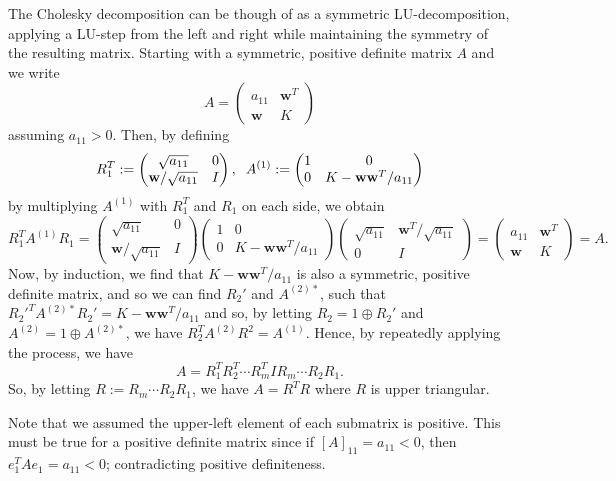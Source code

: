 \documentclass[
]{article}
\theoremstyle{definition}
\theoremstyle{definition}
\begin{document}
The Cholesky decomposition can be though of as a symmetric
LU-decomposition, applying a LU-step from the left and right while
maintaining the symmetry of the resulting matrix. Starting with a
symmetric, positive definite matrix \(A\) and we write
\[A = \begin{pmatrix}
  a_{11} & \mathbf{w}^T\\
  \mathbf{w} & K
  \end{pmatrix}\] assuming \(a_{11} > 0\). Then, by defining
\[R_1^T := \begin{pmatrix}
  \sqrt{a_{11}} & 0\\
  \mathbf{w} / \sqrt{a_{11}} & I
  \end{pmatrix}, \hspace{2mm} A^{(1)} := 
  \begin{pmatrix}
    1 & 0\\
    0 & K - \mathbf{w}\mathbf{w}^T / a_{11}
  \end{pmatrix}\] by multiplying \(A^{(1)}\) with \(R_1^T\) and \(R_1\)
on each side, we obtain \[R_1^T A^{(1)} R_1 = 
  \begin{pmatrix}
  \sqrt{a_{11}} & 0\\
  \mathbf{w} / \sqrt{a_{11}} & I
  \end{pmatrix}
  \begin{pmatrix}
    1 & 0\\
    0 & K - \mathbf{w}\mathbf{w}^T / a_{11}
  \end{pmatrix}
  \begin{pmatrix}
  \sqrt{a_{11}} & \mathbf{w}^T / \sqrt{a_{11}}\\
  0 & I
  \end{pmatrix}
  = 
  \begin{pmatrix}
  a_{11} & \mathbf{w}^T\\
  \mathbf{w} & K
  \end{pmatrix} = A.\] Now, by induction, we find that
\(K - \mathbf{w}\mathbf{w}^T / a_{11}\) is also a symmetric, positive
definite matrix, and so we can find \(R_2'\) and \(A^{(2)*}\), such that
\(R_2'^T A^{(2)*} R_2' = K - \mathbf{w}\mathbf{w}^T / a_{11}\) and so,
by letting \(R_2 = 1 \oplus R_2'\) and \(A^{(2)} = 1 \oplus A^{(2)*}\),
we have \(R_2^T A^{(2)} R^2 = A^{(1)}\). Hence, by repeatedly applying
the process, we have
\[A = R_1^T R_2^T \cdots R_m^T I R_m \cdots R_2 R_1.\] So, by letting
\(R := R_m \cdots R_2 R_1\), we have \(A = R^T R\) where \(R\) is upper
triangular.

Note that we assumed the upper-left element of each submatrix is
positive. This must be true for a positive definite matrix since if
\([A]_{11} = a_{11} < 0\), then \(e_1^T A e_1 = a_{11} < 0\);
contradicting positive definiteness.
\end{document}
